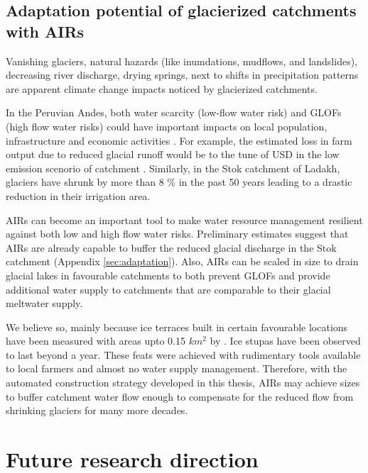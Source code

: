 \subsection{Adaptation potential of glacierized catchments with AIRs}

Vanishing glaciers, natural hazards (like inumdations, mudflows, and landslides), decreasing river discharge,
drying springs, next to shifts in precipitation patterns are apparent climate change impacts noticed by
glacierized catchments.

In the Peruvian Andes, both water scarcity (low-flow water risk) and GLOFs (high flow water risks) could have
important impacts on local population, infrastructure and economic activities
\citep{motschmannIntegratedAssessmentsWater2020}. For example, the estimated loss in farm output due to reduced
glacial runoff would be to the tune of USD in the low emission scenorio of catchment
\citep{motschmannCurrentFutureWater2022}. Similarly, in the Stok catchment of Ladakh, glaciers have shrunk by
more than 8 \% in the past 50 years \citep{sohebMassbalanceObservationReconstruction2020} leading to a drastic
reduction in their irrigation area. 

AIRs can become an important tool to make water resource management resilient against both low and high flow
water risks. Preliminary estimates suggest that AIRs are already capable to buffer the reduced glacial discharge
in the Stok catchment (Appendix \ref{sec:adaptation}). Also, AIRs can be scaled in size to drain glacial lakes
in favourable catchments to both prevent GLOFs and provide additional water supply to catchments that are
comparable to their glacial meltwater supply.

We believe so, mainly because ice terraces built in certain favourable locations have been measured with areas
upto 0.15 $km^2$ by \citet{nusserSociohydrologyArtificialGlaciers2019}. Ice stupas have been observed to last
beyond a year. These feats were achieved with rudimentary tools available to local farmers and almost no water
supply management. Therefore, with the automated construction strategy developed in this thesis, AIRs may
achieve sizes to buffer catchment water flow enough to compensate for the reduced flow from shrinking glaciers
for many more decades.

\section{Future research direction}

